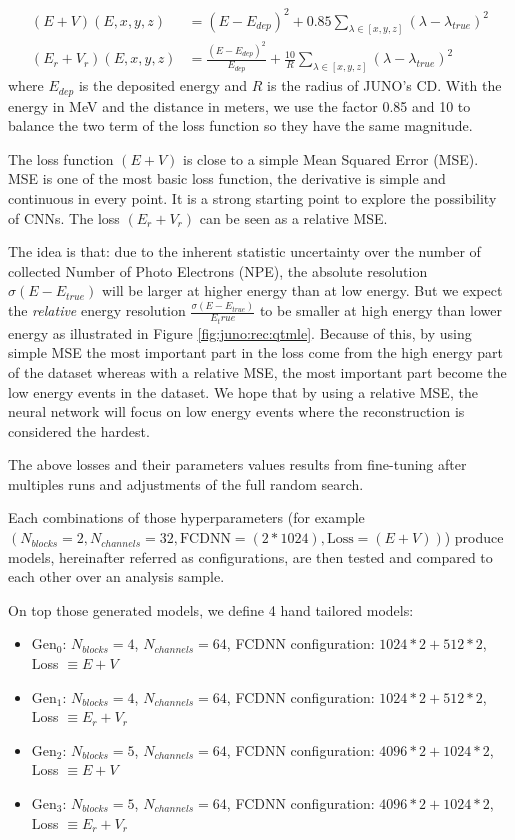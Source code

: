 \documentclass[../main.tex]{subfiles}
\begin{document}
\begin{align}
  (E+V)(E, x, y, z) &= (E - E_{dep})^2 + 0.85 \sum_{\lambda \in [x, y, z]} (\lambda - \lambda_{true})^2 \\
  (E_r + V_r)(E, x, y, z) &=  \frac{(E - E_{dep}) ^ 2}{E_{dep}} + \frac{10}{R} \sum_{\lambda \in [x, y, z]} (\lambda - \lambda_{true})^2
\end{align}
where $E_{dep}$ is the deposited energy and $R$ is the radius of JUNO's CD. With the energy in MeV and the distance in meters, we use the factor 0.85 and 10 to balance the two term of the loss function so they have the same magnitude.


The loss function $(E+V)$ is close to a simple Mean Squared Error (MSE). MSE is one of the most basic loss function, the derivative is simple and continuous in every point. It is a strong starting point to explore the possibility of CNNs. The loss $(E_r + V_r)$ can be seen as a relative MSE.

The idea is that: due to the inherent statistic uncertainty over the number of collected Number of Photo Electrons (NPE), the absolute resolution $\sigma (E - E_{true})$ will be larger at higher energy than at low energy. But we expect the \textit{relative} energy resolution $\frac{\sigma(E - E_{true})}{E_true}$ to be smaller at high energy than lower energy as illustrated in Figure \ref{fig:juno:rec:qtmle}. Because of this, by using simple MSE the most important part in the loss come from the high energy part of the dataset whereas with a relative MSE, the most important part become the low energy events in the dataset. We hope that by using a relative MSE, the neural network will focus on low energy events where the reconstruction is considered the hardest.


The above losses and their parameters values results from fine-tuning after multiples runs and adjustments of the full random search.


Each combinations of those hyperparameters (for example $(N_{blocks} = 2, N_{channels} = 32, \mathrm{FCDNN} = (2 * 1024), \mathrm{Loss} = (E+V))$) produce models, hereinafter referred as configurations, are then tested and compared to each other over an analysis sample.

On top those generated models, we define 4 hand tailored models:
\begin{itemize}
  \item $\mathrm{Gen}_0$: $N_{blocks} = 4$, $N_{channels} = 64$, FCDNN configuration: $1024 * 2 + 512 * 2$, Loss $\equiv E+V$
  \item $\mathrm{Gen}_1$: $N_{blocks} = 4$, $N_{channels} = 64$, FCDNN configuration: $1024 * 2 + 512 * 2$, Loss $\equiv E_r+V_r$
  \item $\mathrm{Gen}_2$: $N_{blocks} = 5$, $N_{channels} = 64$, FCDNN configuration: $4096 * 2 + 1024 * 2$, Loss $\equiv E+V$
  \item $\mathrm{Gen}_3$: $N_{blocks} = 5$, $N_{channels} = 64$, FCDNN configuration: $4096 * 2 + 1024 * 2$, Loss $\equiv E_r+V_r$
\end{itemize}
\end{document}
